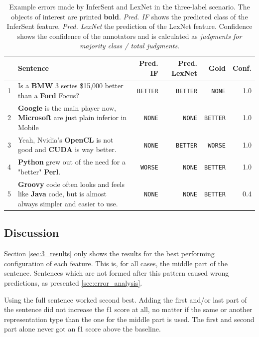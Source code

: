 \begin{table}[htbp]
\caption{Example errors made by InferSent and LexNet in the three-label scenario. The objects of interest are printed \textbf{bold}. \emph{Pred. IF} shows the predicted class of the InferSent feature, \emph{Pred. LexNet} the prediction of the LexNet feature. Confidence shows the confidence of the annotators and is calculated as \emph{judgments for majority class / total judgments}.}
\label{tbl:3_mistakes_both}
\begin{tabularx}{\linewidth}{lXrrrr}
\toprule
 & Sentence & Pred. IF & Pred. LexNet & Gold & Conf. \\ \midrule
1 & Is a \textbf{BMW} 3 series \$15,000 better than a \textbf{Ford} Focus? & \texttt{BETTER} & \texttt{BETTER} & \texttt{NONE} & 1.0\\ %

2 & \textbf{Google} is the main player now, \textbf{Microsoft} are just plain inferior in Mobile & \texttt{NONE} & \texttt{NONE} & \texttt{BETTER} & 1.0\\ %

3 & Yeah, Nvidia's \textbf{OpenCL} is not good and \textbf{CUDA} is way better. & \texttt{NONE} & \texttt{BETTER} & \texttt{WORSE} & 1.0\\ %

4 & \textbf{Python} grew out of the need for a "better" \textbf{Perl}. & \texttt{WORSE} & \texttt{NONE} & \texttt{BETTER} & 1.0\\

5 & \textbf{Groovy} code often looks and feels like \textbf{Java} code, but is almost always simpler and easier to use. & \texttt{NONE} & \texttt{NONE} & \texttt{BETTER} & 0.4\\ %

 \bottomrule
\end{tabularx}
\end{table}

\FloatBarrier
\subsection{Discussion}
Section \ref{sec:3_results} only shows the results for the best performing configuration of each feature. This is, for all cases, the middle part of the sentence. Sentences which are not formed after this pattern caused wrong predictions, as presented \ref{sec:error_analysis}.

Using the full sentence worked second best. Adding the first and/or last part of the sentence did not increase the f1 score at all, no matter if the same or another representation type than the one for the middle part is used. The first and second part alone never got an f1 score above the baseline.

